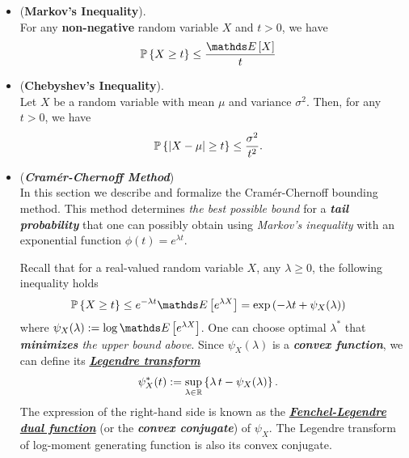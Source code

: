 \documentclass[11pt]{article}
\begin{document}
\begin{itemize}
\item 
\begin{proposition} (\textbf{Markov's Inequality}). \citep{vershynin2018high}\\
For any \textbf{non-negative} random variable $X$ and $t > 0$, we have
\begin{align}
\bP\set{X \ge t} &\le \frac{\E{}{X}}{t} \label{ineqn: markov_inequality}
\end{align}
\end{proposition}

\item \begin{proposition} (\textbf{Chebyshev's Inequality}). \citep{vershynin2018high}\\
Let $X$ be a random variable with mean $\mu$ and variance $\sigma^2$. Then, for any $t > 0$, we have
\begin{align}
{\mathbb P}\left\{\left\lvert X - \mu \right\rvert \ge t\right\} &\le \frac{\sigma^2}{t^2}. \label{ineqn: chebyshev_inequality}
\end{align}
\end{proposition}

\item \begin{remark}(\textbf{\emph{Cram\'er-Chernoff Method}})\\
In this section we describe and formalize the Cram{\'e}r-Chernoff bounding method. This method determines \emph{the best possible bound} for a \emph{\textbf{tail probability}} that one can possibly obtain using \emph{Markov's inequality} with an exponential function $\phi(t) = e^{\lambda t}$.

Recall that for a real-valued random variable $X$, any $\lambda \ge 0$, the following inequality holds
\begin{align*}
\bP\set{X \ge t} &\le e^{-\lambda t} \E{}{e^{\lambda X}} = \exp\paren{-\lambda t + \psi_{X}(\lambda) }
\end{align*} where $\psi_{X}(\lambda) := \log   \E{}{e^{\lambda X}}$. One can choose optimal $\lambda^{*}$ that \emph{\textbf{minimizes} the upper bound above}.
Since $\psi_{X}(\lambda)$ is a \emph{\textbf{convex function}}, we can define its \underline{\emph{\textbf{Legendre transform}}}
\begin{align*}
\psi^{*}_{X}(t) &:= \sup_{\lambda \in {\mathbb R}}\left\{\lambda\,t - \psi_{X}(\lambda)\right\}.
\end{align*} The expression of the right-hand side is known as the \underline{\emph{\textbf{Fenchel-Legendre dual function}}} (or the \textbf{\emph{convex conjugate}}) of $\psi_{X}$. The Legendre transform of log-moment generating function is also its convex conjugate. %


\end{remark}
\end{itemize}
\end{document}
